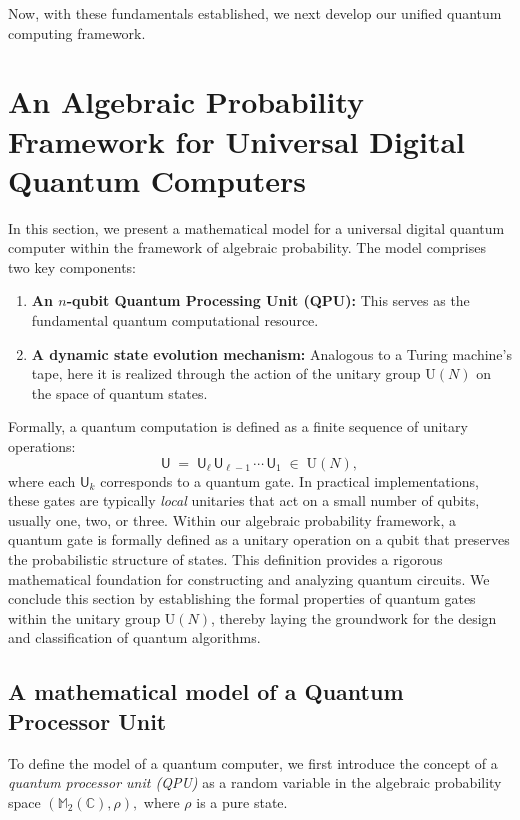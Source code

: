\documentclass[a4paper,11pt]{article}
\newcommand{\rU}{\mathsf{U}}
\begin{document}
Now, with these fundamentals established, we next develop our unified quantum computing framework.

\section{An Algebraic Probability Framework for Universal Digital Quantum Computers}\label{ch_3}

In this section, we present a mathematical model for a universal digital quantum computer within the framework of algebraic probability. The model comprises two key components:

\begin{enumerate}
    \item \textbf{An \(n\)-qubit Quantum Processing Unit (QPU):} This serves as the fundamental quantum computational resource.
    \item \textbf{A dynamic state evolution mechanism:} Analogous to a Turing machine's tape, here it is realized through the action of the unitary group \(\mathrm{U}(N)\) on the space of quantum states.
\end{enumerate}

Formally, a quantum computation is defined as a finite sequence of unitary operations:
\[
    \rU \;=\; \rU_{\ell}\,\rU_{\ell-1}\,\cdots\,\rU_1 \;\in\; \mathrm{U}(N),
\]
where each \(\rU_k\) corresponds to a quantum gate. In practical implementations, these gates are typically \emph{local} unitaries that act on a small number of qubits, usually one, two, or three. Within our algebraic probability framework, a quantum gate is formally defined as a unitary operation on a qubit that preserves the probabilistic structure of states. This definition provides a rigorous mathematical foundation for constructing and analyzing quantum circuits. 
We conclude this section by establishing the formal properties of quantum gates within the unitary group \(\mathrm{U}(N)\), thereby laying the groundwork for the design and classification of quantum algorithms.

\subsection{A mathematical model of a Quantum Processor Unit}

To define the model of a quantum computer, we first introduce the concept of a \emph{quantum processor unit (QPU)} as a random variable in the algebraic probability space $(\mathbb{M}_2(\mathbb{C}),\rho),$ where $\rho$ is a pure state. 
\end{document}
